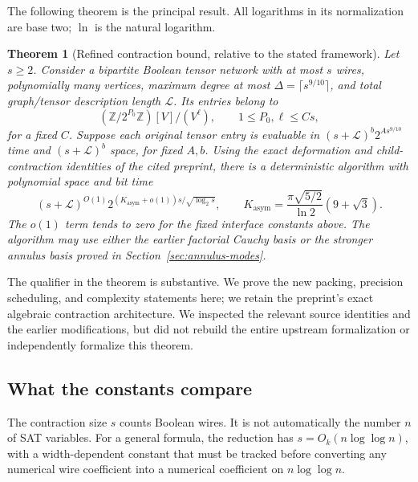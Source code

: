 \documentclass[11pt,letterpaper]{article}
\newtheorem{theorem}{Theorem}[section]
\theoremstyle{remark}\newtheorem{remark}[theorem]{Remark}
\newcommand{\KL}{K_{\mathrm{asym}}}
\begin{document}
The following theorem is the principal result. All logarithms in its
normalization are base two; $\ln$ is the natural logarithm.
\begin{theorem}[Refined contraction bound, relative to the stated framework]
\label{thm:main}
Let $s\ge2$. Consider a bipartite Boolean tensor network with at most $s$
wires, polynomially many vertices, maximum degree at most
$\Delta=\lceil s^{9/10}\rceil$, and total graph/tensor description length
$\mathcal L$. Its entries belong to
\[
 (\mathbb Z/2^{P_0}\mathbb Z)[V]/(V^\ell),\qquad
 1\le P_0,\ell\le C s,
\]
for a fixed $C$. Suppose each original tensor entry is evaluable in
$(s+\mathcal L)^b2^{A s^{9/10}}$ time and $(s+\mathcal L)^b$ space,
for fixed $A,b$. Using the exact deformation and child-contraction
identities of the cited preprint, there is a deterministic algorithm
with polynomial space and bit time
\begin{equation}\label{eq:headline}
 (s+\mathcal L)^{O(1)}
 2^{(\KL+o(1))s/\sqrt{\log_2s}},\qquad
 \KL=\frac{\pi\sqrt{5/2}}{\ln2}(9+\sqrt3).
\end{equation}
The $o(1)$ term tends to zero for the fixed interface constants above.
The algorithm may use either the earlier factorial Cauchy basis or the
stronger annulus basis proved in Section~\ref{sec:annulus-modes}.
\end{theorem}

The qualifier in the theorem is substantive. We prove the new packing,
precision scheduling, and complexity statements here; we retain the
preprint's exact algebraic contraction architecture. We inspected the
relevant source identities and the earlier modifications, but did not
rebuild the entire upstream formalization or independently formalize
this theorem.

\subsection{What the constants compare}
The contraction size $s$ counts Boolean wires. It is not automatically
the number $n$ of SAT variables. For a general formula, the reduction
has $s=O_k(n\log\log n)$, with a width-dependent constant that must be
tracked before converting any numerical wire coefficient into a
numerical coefficient on $n\log\log n$.
\end{document}
